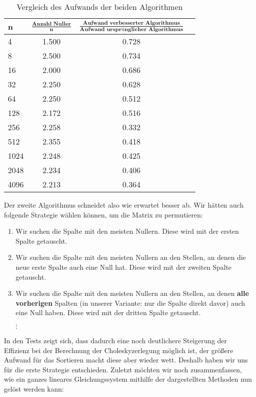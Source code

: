 \begin{table}[htb]
\centering
\caption{Vergleich des Aufwands der beiden Algorithmen}
\begin{tabular}{lccc}
\toprule
\textbf{n}	& \textbf{$\frac{\mathrm{\textbf{Anzahl Nuller}}}{\mathrm{\textbf{n}}}$}
&\textbf{$\frac{\mathrm{\textbf{Aufwand verbesserter Algorithmus}}}{\mathrm{\textbf{Aufwand ursprünglicher Algorithmus}}}$}  & \\
	        \midrule

4 & 1.500 & 0.728 \\
8 & 2.500 & 0.734 \\
16 & 2.000 & 0.686 \\
32 & 2.250 & 0.628 \\
64 & 2.250 & 0.512 \\
128 & 2.172 & 0.516 \\
256 & 2.258 & 0.332 \\
512 & 2.355 & 0.418 \\
1024 & 2.248 & 0.425 \\
2048 & 2.234 & 0.406 \\
4096 & 2.213 & 0.364 \\
\end{tabular}
\end{table}

Der zweite Algorithmus schneidet also wie erwartet besser ab. Wir hätten auch folgende Strategie wählen können, um die Matrix zu permutieren:

\begin{enumerate}
    \item Wir suchen die Spalte mit den meisten Nullern. Diese wird mit der ersten Spalte getauscht.
    \item Wir suchen die Spalte mit den meisten Nullern an den Stellen, an denen die neue erste Spalte auch eine Null hat. Diese wird mit der zweiten Spalte getauscht.
    \item Wir suchen die Spalte mit den meisten Nullern an den Stellen, an denen \textbf{alle vorherigen} Spalten (in unserer Variante: nur die Spalte direkt davor) auch eine Null haben. Diese wird mit der dritten Spalte getauscht.

    $\vdots$
\end{enumerate}

In den Tests zeigt sich, dass dadurch eine noch deutlichere Steigerung der Effizienz bei der Berechnung der Choleskyzerlegung möglich ist, der größere Aufwand für das Sortieren macht diese aber wieder wett. Deshalb haben wir uns für die erste Strategie entschieden.
\newline
\newline
Zuletzt möchten wir noch zusammenfassen, wie ein ganzes lineares Gleichungssystem mithilfe der dargestellten Methoden nun gelöst werden kann:

